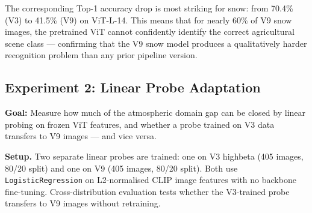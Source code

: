 \noindent The corresponding Top-1 accuracy drop is most striking for snow: from 70.4\% (V3) to 41.5\% (V9) on ViT-L-14. This means that for nearly 60\% of V9 snow images, the pretrained ViT cannot confidently identify the correct agricultural scene class — confirming that the V9 snow model produces a qualitatively harder recognition problem than any prior pipeline version.

\FloatBarrier
\subsection{Experiment 2: Linear Probe Adaptation}
\label{sec:exp2}

\noindent \textbf{Goal:} Measure how much of the atmospheric domain gap can be closed by linear probing on frozen ViT features, and whether a probe trained on V3 data transfers to V9 images — and vice versa.

\noindent \textbf{Setup.} Two separate linear probes are trained: one on V3 highbeta (405 images, 80/20 split) and one on V9 (405 images, 80/20 split). Both use \texttt{LogisticRegression} on L2-normalised CLIP image features with no backbone fine-tuning. Cross-distribution evaluation tests whether the V3-trained probe transfers to V9 images without retraining.

\begin{table}[htbp]
\centering
\caption{Experiment~2: Zero-shot vs linear probe accuracy across evaluation sets. V3 and V9 probes work in-distribution but do not cross-transfer, confirming that each physics pipeline creates a distinct feature-space distribution.}
\label{tab:exp2_linear_probe}
\renewcommand{\arraystretch}{1.3}
\end{table}

